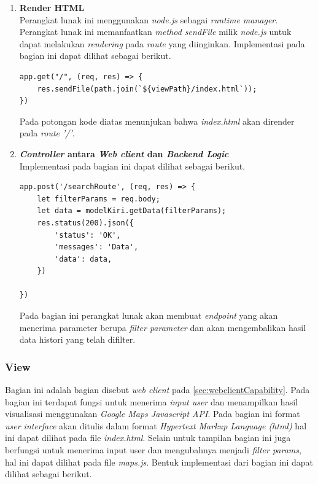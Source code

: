 \begin{enumerate}
    \item \textbf{Render HTML} \\
Perangkat lunak ini menggunakan \textit{node.js} sebagai \textit{runtime manager}. Perangkat lunak ini memanfaatkan \textit{method sendFile} milik \textit{node.js} untuk dapat melakukan \textit{rendering} pada \textit{route} yang diinginkan. Implementasi pada bagian ini dapat dilihat sebagai berikut.

\begin{lstlisting}[label=render_html , caption=Render HTML]
app.get("/", (req, res) => {
    res.sendFile(path.join(`${viewPath}/index.html`));
})
\end{lstlisting}
Pada potongan kode diatas menunjukan bahwa \textit{index.html} akan dirender pada \textit{route '/'}.

\item \textbf{\textit{Controller} antara \textit{Web client} dan \textit{Backend Logic}} \\
Implementasi pada bagian ini dapat dilihat sebagai berikut.
\begin{lstlisting}[label=render_html , caption=Get Filtered Data]
app.post('/searchRoute', (req, res) => {
    let filterParams = req.body;
    let data = modelKiri.getData(filterParams);
    res.status(200).json({
        'status': 'OK',
        'messages': 'Data',
        'data': data,
    })

})
\end{lstlisting}

Pada bagian ini perangkat lunak akan membuat \textit{endpoint} yang akan menerima parameter berupa \textit{filter parameter} dan akan mengembalikan hasil data histori yang telah difilter.
\end{enumerate}

\subsubsection{View}
Bagian ini adalah bagian disebut \textit{web client} pada \ref{sec:webclientCapability}. Pada bagian ini terdapat fungsi untuk menerima \textit{input user} dan menampilkan hasil visualisasi menggunakan \textit{Google Maps Javascript API}. Pada bagian ini format \textit{user interface} akan ditulis dalam  format \textit{Hypertext Markup Language (html)} hal ini dapat dilihat pada file \textit{index.html}.
Selain untuk tampilan bagian ini juga berfungsi untuk menerima input user dan mengubahnya menjadi \textit{filter params}, hal ini dapat dilihat pada file \textit{maps.js}. Bentuk implementasi dari bagian ini dapat dilihat sebagai berikut.

